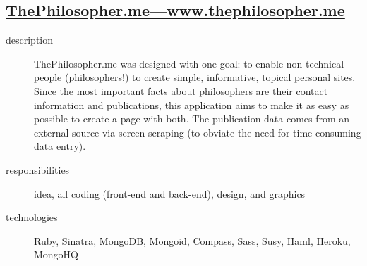 \documentclass{article}
\begin{document}

\subsection{\href{http://www.thephilosopher.me}
  {ThePhilosopher.me---www.thephilosopher.me}}
\label{sub:ThePhilosopher}

\begin{multicols}{2}

\begin{description}
  \item[description] ThePhilosopher.me was designed with one goal: to 
    enable non-technical people (philosophers!) to create simple, 
    informative, topical personal sites.  Since the most important 
    facts about philosophers are their contact information and 
    publications, this application aims to make it as easy as possible 
    to create a page with both.  The publication data comes from an 
    external source via screen scraping (to obviate the need for 
    time-consuming data entry).
  \item[responsibilities] idea, all coding (front-end and back-end), 
    design, and graphics
  \item[technologies] Ruby, Sinatra, MongoDB, Mongoid, Compass, Sass, 
    Susy, Haml, Heroku, MongoHQ
\end{description}

\vfill
\columnbreak
{}
\end{multicols}
\end{document}
